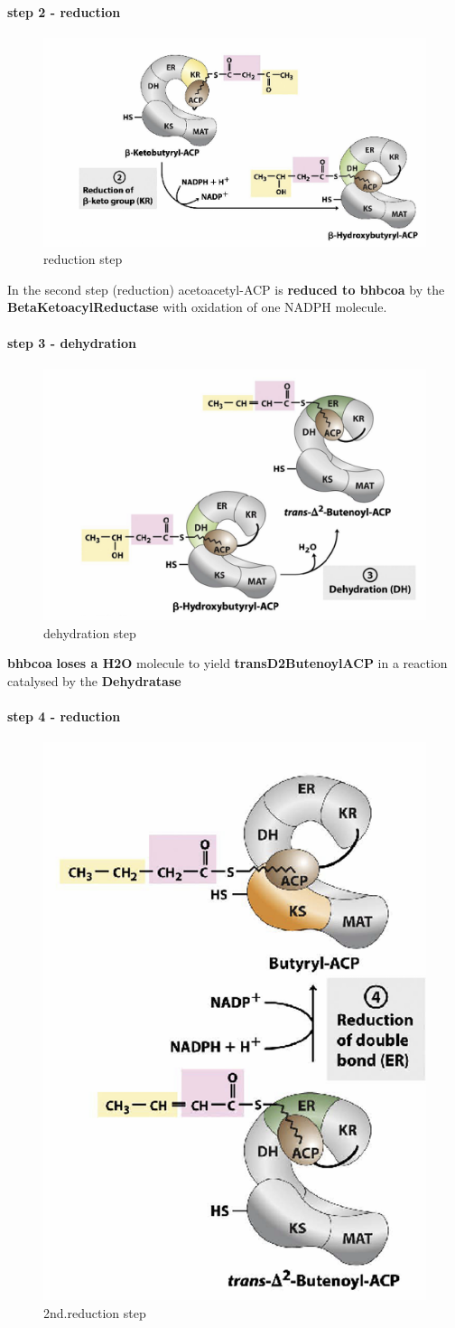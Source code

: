 \documentclass[../main.tex]{subfiles}
\begin{document}
\paragraph{step 2 - reduction}
\begin{figure}[H]
    \centering
    \includegraphics[width=0.5\linewidth]{step2.png}
    \caption{reduction step}
    \label{fig:enter-label}
\end{figure}
 In the second step (reduction) acetoacetyl-ACP is \textbf{reduced to \gls{bhbcoa}} by 
the \textbf{\gls{BetaKetoacylReductase}} with oxidation of one NADPH molecule.


\paragraph{step 3 - dehydration}
\begin{figure}[H]
    \centering
    \includegraphics[width=0.5\linewidth]{step3.png}
    \caption{dehydration step}
    \label{fig:enter-label}
\end{figure}

\textbf{\gls{bhbcoa}} \textbf{loses a H2O }molecule to yield \textbf{\gls{transD2ButenoylACP}} in a reaction catalysed by the \textbf{\gls{Dehydratase}}

\paragraph{step 4 - reduction}
\begin{figure}[H]
    \centering
    \includegraphics[width=0.3\linewidth]{step4.png}
    \caption{2nd.reduction step}
    \label{fig:enter-label}
\end{figure}
\end{document}
